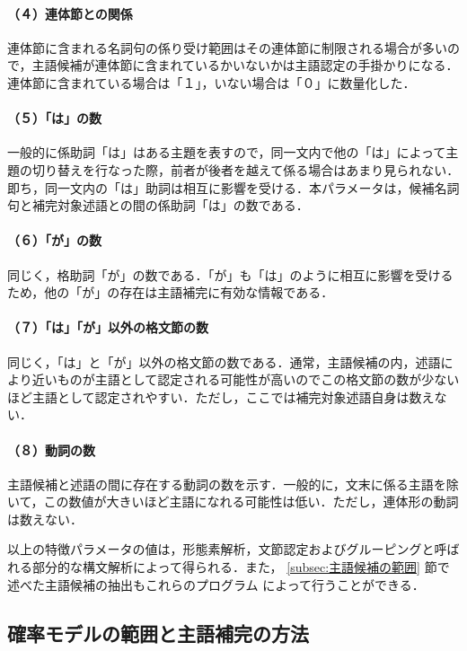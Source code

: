 \paragraph{（４）連体節との関係}
連体節に含まれる名詞句の係り受け範囲はその連体節に制限される場合が多いので，主語候補が連体節に含まれているかいないかは主語認定の手掛かりになる．連体節に含まれている場合は「１」，いない場合は「０」に数量化した．

\paragraph{（５）「は」の数}
一般的に係助詞「は」はある主題を表すので，同一文内で他の「は」によって主題の切り替えを行なった際，前者が後者を越えて係る場合はあまり見られない．即ち，同一文内の「は」助詞は相互に影響を受ける．本パラメータは，候補名詞句と補完対象述語との間の係助詞「は」の数である．

\paragraph{（６）「が」の数}
同じく，格助詞「が」の数である．「が」も「は」のように相互に影響を受けるため，他の「が」の存在は主語補完に有効な情報である．

\paragraph{（７）「は」「が」以外の格文節の数}
同じく，「は」と「が」以外の格文節の数である．通常，主語候補の内，述語により近いものが主語として認定される可能性が高いのでこの格文節の数が少ないほど主語として認定されやすい．ただし，ここでは補完対象述語自身は数えない．

\paragraph{（８）動詞の数}
主語候補と述語の間に存在する動詞の数を示す．一般的に，文末に係る主語を除
いて，この数値が大きいほど主語になれる可能性は低い．ただし，連体形の動詞
は数えない．

\bigskip\bigskip
以上の特徴パラメータの値は，形態素解析，文節認定およびグルーピングと呼ば
れる部分的な構文解析によって得られる\cite{金94}．また，
\ref{subsec:主語候補の範囲} 節で述べた主語候補の抽出もこれらのプログラム
によって行うことができる．

\subsection{確率モデルの範囲と主語補完の方法} \label{subsec:確率モデルの範囲と主語補完の方法}

